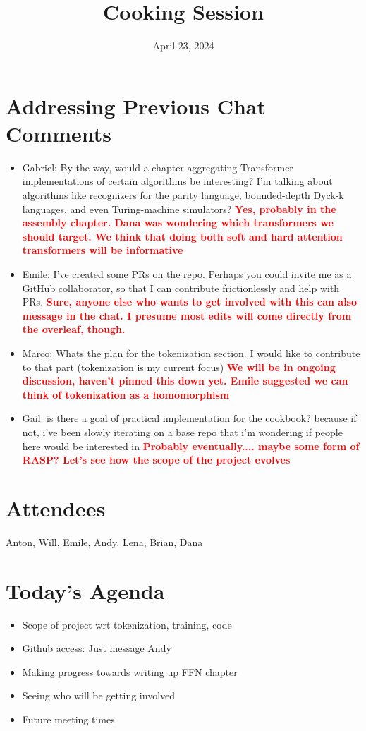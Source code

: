 \documentclass{article}
\title{Cooking Session}
\date{April 23, 2024}
\newcommand{\response}[1]{{\textcolor{red}{\textbf{#1}}}}
\begin{document}
\maketitle
\section{Addressing Previous Chat Comments}
\begin{itemize}
    \item Gabriel: By the way, would a chapter aggregating Transformer implementations of certain algorithms be interesting? I'm talking about algorithms like recognizers for the parity language, bounded-depth Dyck-k languages, and even Turing-machine simulators? \response{Yes, probably in the assembly chapter. Dana was wondering which transformers we should target. We think that doing both soft and hard attention transformers will be informative}
    \item Emile: I've created some PRs on the repo. Perhaps you could invite me as a GitHub collaborator, so that I can contribute frictionlessly and help with PRs. \response{Sure, anyone else who wants to get involved with this can also message in the chat. I presume most edits will come directly from the overleaf, though.}
    \item Marco: Whats the plan for the tokenization section. I would like to contribute to that part (tokenization is my current focus) \response{We will be in ongoing discussion, haven't pinned this down yet. Emile suggested we can think of tokenization as a homomorphism}
    \item Gail: is there a goal of practical implementation for the cookbook? because if not, i've been slowly iterating on a base repo that i'm wondering if people here would be interested in \response{Probably eventually.... maybe some form of RASP? Let's see how the scope of the project evolves}
\end{itemize}

\section{Attendees}
Anton, Will, Emile, Andy, Lena, Brian, Dana

\section{Today's Agenda}
\begin{itemize}
    \item Scope of project wrt tokenization, training, code
    \item Github access: Just message Andy
    \item Making progress towards writing up FFN chapter
    \item Seeing who will be getting involved
    \item Future meeting times
\end{itemize}
\end{document}
